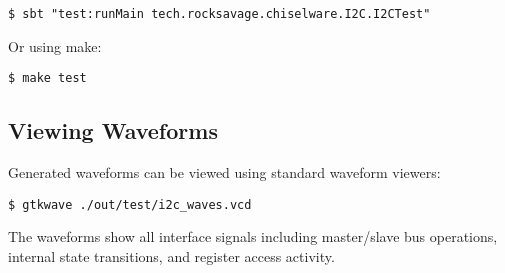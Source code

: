 \begin{verbatim}
$ sbt "test:runMain tech.rocksavage.chiselware.I2C.I2CTest"
\end{verbatim}

Or using make:

\begin{verbatim}
$ make test
\end{verbatim}

\subsection{Viewing Waveforms}
Generated waveforms can be viewed using standard waveform viewers:

\begin{verbatim}
$ gtkwave ./out/test/i2c_waves.vcd
\end{verbatim}

The waveforms show all interface signals including master/slave bus operations, internal state transitions, and register access activity.